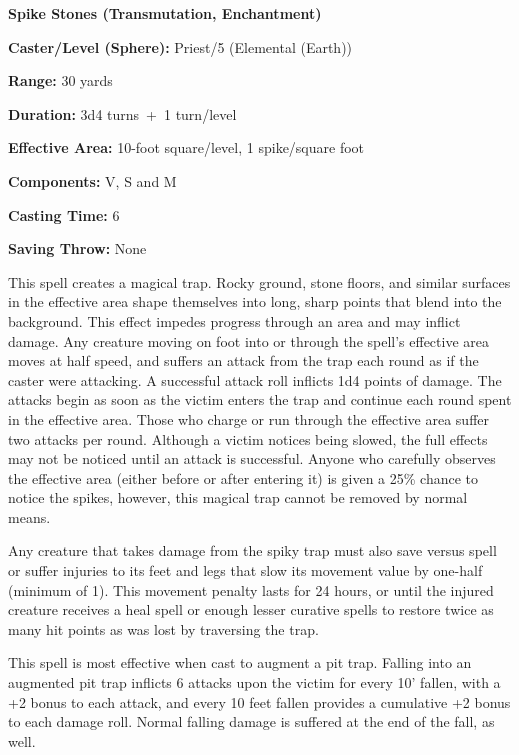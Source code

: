 \begin{multicols}{2}
\noindent
\begin{minipage}{\columnwidth}

\noindent \textbf{Spike Stones (Transmutation, Enchantment)}

\noindent \textbf{Caster/Level (Sphere):} Priest/5 (Elemental (Earth))

\noindent \textbf{Range:} 30 yards

\noindent \textbf{Duration:} 3d4 turns~+~1 turn/level

\noindent \textbf{Effective Area:} 10-foot square/level, 1 spike/square foot

\noindent \textbf{Components:} V, S and M

\noindent \textbf{Casting Time:} 6

\noindent \textbf{Saving Throw:} None

\end{minipage}

This spell creates a magical trap.  Rocky ground, stone floors, and similar surfaces in the effective area shape themselves into long, sharp points that blend into the background.  This effect impedes progress through an area and may inflict damage.  Any creature moving on foot into or through the spell's effective area moves at half speed, and suffers an attack from the trap each round as if the caster were attacking.  A successful attack roll inflicts 1d4 points of damage.  The attacks begin as soon as the victim enters the trap and continue each round spent in the effective area.  Those who charge or run through the effective area suffer two attacks per round.  Although a victim notices being slowed, the full effects may not be noticed until an attack is successful.  Anyone who carefully observes the effective area (either before or after entering it) is given a 25\% chance to notice the spikes, however, this magical trap cannot be removed by normal means.  

Any creature that takes damage from the spiky trap must also save versus spell or suffer injuries to its feet and legs that slow its movement value by one-half (minimum of 1).  This movement penalty lasts for 24 hours, or until the injured creature receives a heal spell or enough lesser curative spells to restore twice as many hit points as was lost by traversing the trap. 

This spell is most effective when cast to augment a pit trap.  Falling into an augmented pit trap inflicts 6 attacks upon the victim for every 10' fallen, with a +2 bonus to each attack, and every 10 feet fallen provides a cumulative +2 bonus to each damage roll.  Normal falling damage is suffered at the end of the fall, as well.


\end{multicols}
